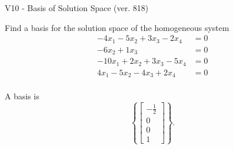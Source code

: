 \begin{exercise}
  \begin{exerciseTitle}V10 - Basis of Solution Space (ver. 818)\end{exerciseTitle}
  \begin{exerciseStatement}
    Find a basis for the solution space of the homogeneous system 
\begin{align*}
 -4 x_ 1 -5 x_ 2 + 3 x_ 3 -2 x_ 4 &= 0  \\ 
  -6 x_ 2 + 1 x_ 3 &= 0  \\ 
  -10 x_ 1 + 2 x_ 2 + 3 x_ 3 -5 x_ 4 &= 0  \\ 
  4 x_ 1 -5 x_ 2 -4 x_ 3 + 2 x_ 4 &= 0  \\ 
 \end{align*}


 
  \end{exerciseStatement}

  \begin{exerciseAnswer}
   A basis is   
\[\left\{\left[\begin{array}{c}
-\frac{1}{2} \\
0 \\
0 \\
1
\end{array}\right]\right\}.\]

  


  \end{exerciseAnswer}
\end{exercise}